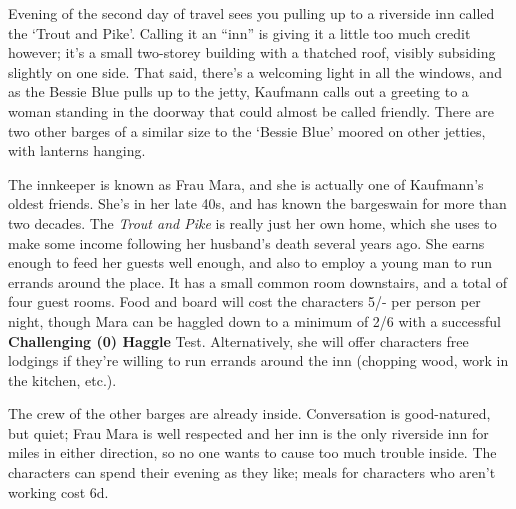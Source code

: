 \begin{callout}
Evening of the second day of travel sees you pulling up to a riverside inn
called the `Trout and Pike'. Calling it an ``inn'' is giving it a little too much
credit however; it's a small two-storey building with a thatched roof, visibly
subsiding slightly on one side. That said, there's a welcoming light in all the
windows, and as the Bessie Blue pulls up to the jetty, Kaufmann calls
out a greeting to a woman standing in the doorway that could almost be called
friendly. There are two other barges of a similar size to the `Bessie Blue'
moored on other jetties, with lanterns hanging.
\end{callout}

The innkeeper is known as Frau Mara, and she is actually one of Kaufmann's
oldest friends. She's in her late 40s, and has known the bargeswain for more
than two decades. The \textit{Trout and Pike} is really just her own home,
which she uses to make some income following her husband's death several years
ago. She earns enough to feed her guests well enough, and also to employ a
young man to run errands around the place. It has a small common room downstairs,
and a total of four guest rooms. Food and board will cost the characters 5/- per
person per night, though Mara can be haggled down to a minimum of 2/6 with a
successful \textbf{Challenging (0) Haggle} Test. Alternatively, she will offer
characters free lodgings if they're willing to run errands around the inn
(chopping wood, work in the kitchen, etc.).

The crew of the other barges are already inside. Conversation is good-natured,
but quiet; Frau Mara is well respected and her inn is the only riverside inn for
miles in either direction, so no one wants to cause too much trouble inside.
The characters can spend their evening as they like; meals for characters who
aren't working cost 6d.
